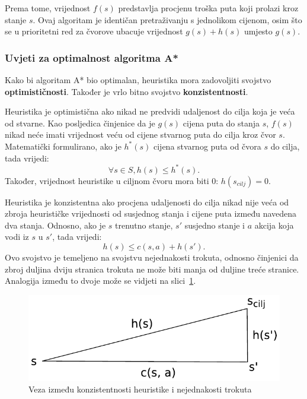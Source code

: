 \documentclass[times, utf8, zavrsni, numeric]{fer}
\begin{document}
\par Prema tome, vrijednost \(f(s)\) predstavlja procjenu troška puta koji prolazi kroz stanje \(s\).
Ovaj algoritam je identičan pretraživanju s jednolikom cijenom, osim što se u prioritetni red za čvorove ubacuje vrijednost \(g(s) + h(s)\) umjesto \(g(s)\).

\subsubsection{Uvjeti za optimalnost algoritma A*}

\par Kako bi algoritam A* bio optimalan, heuristika mora zadovoljiti svojstvo \textbf{optimističnosti}.
Također je vrlo bitno svojstvo \textbf{konzistentnosti}.

\par Heuristika je optimistična ako nikad ne predvidi udaljenost do cilja koja je veća od stvarne. 
Kao posljedica činjenice da je \(g(s)\) cijena puta do stanja \(s\), \(f(s)\) nikad neće imati vrijednost veću od cijene stvarnog puta do cilja kroz čvor \(s\).
Matematički formulirano, ako je \(h^*(s)\) cijena stvarnog puta od čvora \(s\) do cilja, tada vrijedi:
\begin{equation}
\forall s \in S, h(s) \leq h^*(s).
\end{equation} 
Također, vrijednost heuristike u ciljnom čvoru mora biti 0: \(h(s_{cilj}) = 0\).

\par Heuristika je konzistentna ako procjena udaljenosti do cilja nikad nije veća od zbroja heurističke vrijednosti od susjednog stanja i cijene puta između navedena dva stanja.
Odnosno, ako je \(s\) trenutno stanje, \(s'\) susjedno stanje i \(a\) akcija koja vodi iz \(s\) u \(s'\), tada vrijedi:
\begin{equation}
h(s) \leq c(s, a) + h(s').
\end{equation} 
Ovo svojstvo je temeljeno na svojstvu nejednakosti trokuta, odnosno činjenici da zbroj duljina dviju stranica trokuta ne može biti manja od duljine treće stranice.
Analogija između to dvoje može se vidjeti na slici~\ref{fig:triangleInequality}.

\begin{figure}[h]
	\centering
	\includegraphics[width=0.5\linewidth]{images/triangleInequality.pdf}
	\caption{Veza između konzistentnosti heuristike i nejednakosti trokuta}
	\label{fig:triangleInequality}
\end{figure} 
\end{document}
